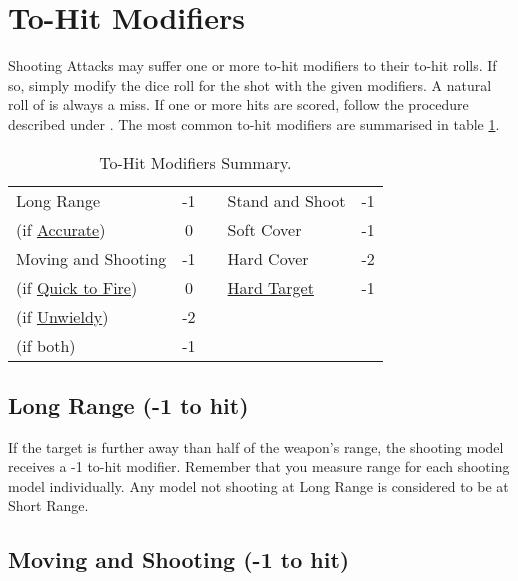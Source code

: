 \section{To-Hit Modifiers}
\label{to_hit_modifiers}

Shooting Attacks may suffer one or more to-hit modifiers to their to-hit rolls. If so, simply modify the dice roll for the shot with the given modifiers. A natural roll of  is always a miss. If one or more hits are scored, follow the procedure described under . The most common to-hit modifiers are summarised in table \ref{table/to_hit_modifiers}.

\vspace*{10pt}
\begin{table}[!hbtp]
\centering
\begin{tabular}{p{4cm} c p{0.5cm} p{4cm} c}
\toprule
Long Range & -1 & & Stand and Shoot &-1 \\
\hspace*{0.3cm}(if \hyperref[accurate]{Accurate}) & 0 & & Soft Cover & -1 \\
Moving and Shooting & -1 & & Hard Cover & -2 \\
\hspace*{0.3cm}(if \hyperref[quick_to_fire]{Quick to Fire}) & 0 & & \hyperref[hard_target]{Hard Target} & -1 \\
\hspace*{0.3cm}(if \hyperref[unwieldy]{Unwieldy}) & -2 & &  &  \\
\hspace*{0.3cm}(if both) & -1 & &  &  \\
\bottomrule
\end{tabular}
\caption{To-Hit Modifiers Summary.}
\label{table/to_hit_modifiers}
\end{table}

\subsection{Long Range (-1 to hit)}
\label{long_range}

If the target is further away than half of the weapon's range, the shooting model receives a -1 to-hit modifier. Remember that you measure range for each shooting model individually.\newline
Any model not shooting at Long Range is considered to be at Short Range.

\subsection{Moving and Shooting (-1 to hit)}
\label{moving_and_shooting}

